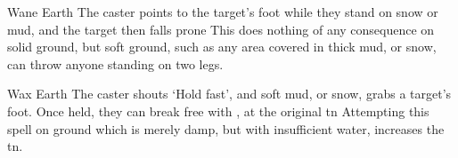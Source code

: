 \ifodd\value{diceNo}

  {}%
  {Wane}%
  {Earth}%
  {}%
  {The caster points to the target's foot while they stand on snow or mud, and the target then falls prone}%
  {
    This does nothing of any consequence on solid ground, but soft ground, such as any area covered in thick mud, or snow, can throw anyone standing on two legs.}

\else

  {}%
  {Wax}%
  {Earth}%
  {}%
  {The caster shouts `Hold fast', and soft mud, or snow, grabs a target's foot.
  Once held, they can break free with , at the original \gls{tn}}%
  {
    Attempting this spell on ground which is merely damp, but with insufficient water, increases the \gls{tn}.
  }

\fi
{}
